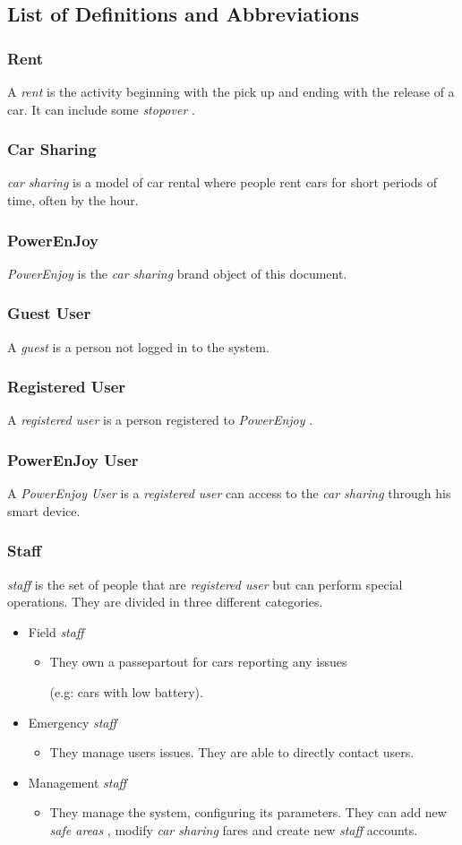 \documentclass[english]{article}
\newcommand{\rent}{\textit{rent }}
\newcommand{\carsharing}{\textit {car sharing }}
\newcommand{\powerenjoy}{\textit{PowerEnjoy }}
\newcommand{\registereduser}{\textit {registered user }}
\newcommand{\powerenjoyuser}{\textit{PowerEnjoy User }}
\newcommand{\staff}{\textit{staff }}
\newcommand{\safeareas}{\textit{safe areas }}
\newcommand{\stopover}{\textit{stopover }}
\newcommand{\guest}{\textit{guest }}
\begin{document}
	\subsection{List of Definitions and Abbreviations}
	\subsubsection{Rent}
			A \rent is the activity beginning with the pick up and ending with the release of a car. It can include some \stopover.
		\subsubsection{Car Sharing}
			\carsharing is a model of car rental where people rent cars for short periods of time, often by the hour.
		\subsubsection{PowerEnJoy}
			\powerenjoy is the \carsharing brand object of this document.
		\subsubsection{Guest User}
			A \guest is a person not logged in to the system.
		\subsubsection{Registered User} 
			A \registereduser is a person registered to \powerenjoy.
		\subsubsection{PowerEnJoy User}
			A \powerenjoyuser is a \registereduser can access to the \carsharing through his smart device.
		\subsubsection{Staff}
			\staff is the set of people that are \registereduser  but can perform special operations. They are divided in three different categories.
			\begin{itemize}
				\item {Field \staff}
				\begin{itemize}
				\item They own a passepartout for cars reporting any issues \\ \par (e.g: cars with low battery).
				\end{itemize}
				\item{Emergency \staff}
				\begin{itemize}
				\item They manage users issues. They are able to directly contact users.
				\end{itemize}
				\item{Management \staff}
				\begin{itemize}
				\item They manage the system, configuring its parameters. They can add new \safeareas, modify \carsharing fares and create new \staff accounts.
				\end{itemize}
			\end{itemize}
\end{document}
